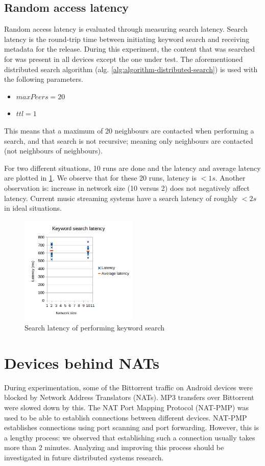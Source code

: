\subsection{Random access latency}
Random access latency is evaluated through measuring search latency. Search latency is the round-trip time between initiating keyword search and receiving metadata for the release.  During this experiment, the content that was searched for was present in all devices except the one under test. The aforementioned distributed search algorithm (alg. \ref{alg:algorithm-distributed-search}) is used with the following parameters.
\begin{itemize}
    \item $maxPeers=20$
    \item $ttl=1$ 
\end{itemize}
This means that a maximum of 20 neighbours are contacted when performing a search, and that search is not recursive; meaning only neighbours are contacted (not neighbours of neighbours).

For two different situations, 10 runs are done and the latency and average latency are plotted in \ref{fig:search-latency}. We observe that for these 20 runs, latency is $<1s$. Another observation is: increase in network size (10 versus 2) does not negatively affect latency. Current music streaming systems have a search latency of roughly $<2s$ in ideal situations.

\begin{figure}
    \centering
    \includegraphics[width=0.5\textwidth]{evaluation/search-latency.png}
    \caption{Search latency of performing keyword search}
    \label{fig:search-latency}
\end{figure}

\section{Devices behind NATs}
During experimentation, some of the Bittorrent traffic on Android devices were blocked by Network Address  Translators (NATs). MP3 transfers over Bittorrent were slowed down by this. The NAT Port Mapping Protocol (NAT-PMP) was used to be able to establish connections between different devices. NAT-PMP establishes connections using port scanning and port forwarding. However, this is a lengthy process: we observed that establishing such a connection usually takes more than 2 minutes. Analyzing and improving this process should be investigated in future distributed systems research.